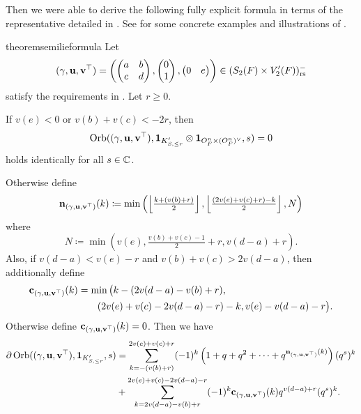 Then we were able to derive the following fully explicit formula
in terms of the representative detailed in .
See  for some concrete examples
and illustrations of .
\begin{restatable}{theorem}{semilieformula}
  \label{thm:semi_lie_formula}
  Let
  \[
    {(\gamma, \mathbf u, \mathbf v^\top)} = \left( \begin{pmatrix} a & b \\ c & d \end{pmatrix},
      \begin{pmatrix} 0 \\ 1 \end{pmatrix},
      \begin{pmatrix} 0 & e \end{pmatrix} \right)
    \in (S_2(F) \times V_2'(F))_{\mathrm{rs}}^-
  \]
  satisfy the requirements in .
  Let $r \ge 0$.

  If $v(e) < 0$ or $v(b) + v(c) < -2r$, then
  \[ \operatorname{Orb}({(\gamma, \mathbf u, \mathbf v^\top)}, \mathbf{1}_{K'_{S, \le r}} \otimes \mathbf{1}_{O_F^n \times (O_F^n)^\vee}, s) = 0 \]
  holds identically for all $s \in \mathbb C$.

  Otherwise define
  \[ \mathbf n_{(\gamma, \mathbf u, \mathbf v^\top)}(k) \coloneqq \min\left( \left\lfloor \tfrac{k + (v(b)+r)}{2} \right\rfloor,
    \left\lfloor \tfrac{(2v(e)+v(c)+r)-k}{2} \right\rfloor, N \right) \]
  where
  \[ N \coloneqq \min \left(
      v(e), \tfrac{v(b)+v(c)-1}{2} + r,
      v(d-a) + r \right). \]
  Also, if $v(d-a) < v(e) - r$ and $v(b) + v(c) > 2v(d-a)$, then additionally define
  \begin{align*}
    \mathbf c_{(\gamma, \mathbf u, \mathbf v^\top)}(k) &= \min\big( k - (2v(d-a)-v(b)+r), \\
      &\qquad (2v(e)+v(c)-2v(d-a)-r)-k, v(e)-v(d-a)-r \big).
  \end{align*}
  Otherwise define $\mathbf c_{(\gamma, \mathbf u, \mathbf v^\top)}(k) = 0$.
  Then we have
  \begin{align*}
    \partial\operatorname{Orb}({(\gamma, \mathbf u, \mathbf v^\top)}, \mathbf{1}_{K'_{S, \le r}}, s)
    &= \sum_{k = -(v(b)+r)}^{2v(e)+v(c)+r} (-1)^k
    \left( 1 + q + q^2 + \dots + q^{\mathbf n_{(\gamma, \mathbf u, \mathbf v^\top)}(k)} \right) (q^s)^k \\
    &+ \sum_{k = 2v(d-a)-v(b)+r}^{2v(e)+v(c)-2v(d-a)-r} (-1)^k \mathbf c_{(\gamma, \mathbf u, \mathbf v^\top)}(k) q^{v(d-a) + r} (q^s)^k.
  \end{align*}
\end{restatable}

